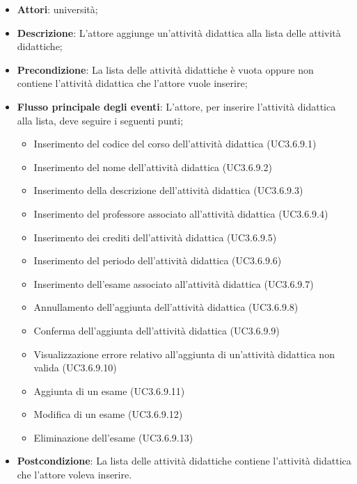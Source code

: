 \begin{itemize}
\item \textbf{Attori}: università;
\item \textbf{Descrizione}: L'attore aggiunge un'attività didattica alla lista delle attività didattiche;

\item \textbf{Precondizione}: La lista delle attività didattiche è vuota oppure non contiene l'attività didattica che l'attore vuole inserire;

\item \textbf{Flusso principale degli eventi}: L'attore, per inserire l'attività didattica alla lista, deve seguire i seguenti punti;

\begin{itemize}
\item Inserimento del codice del corso dell’attività didattica (UC3.6.9.1)
\item Inserimento del nome dell’attività didattica (UC3.6.9.2)
\item Inserimento della descrizione dell’attività didattica (UC3.6.9.3)
\item Inserimento del professore associato all’attività didattica (UC3.6.9.4)
\item Inserimento dei crediti dell’attività didattica (UC3.6.9.5)
\item Inserimento del periodo dell’attività didattica (UC3.6.9.6)
\item Inserimento dell’esame associato all’attività didattica (UC3.6.9.7)
\item Annullamento dell’aggiunta dell’attività didattica (UC3.6.9.8)
\item Conferma dell’aggiunta dell’attività didattica (UC3.6.9.9)
\item Visualizzazione errore relativo all’aggiunta di un’attività didattica non valida (UC3.6.9.10)
\item Aggiunta di un esame (UC3.6.9.11)
\item Modifica di un esame (UC3.6.9.12)
\item Eliminazione dell’esame (UC3.6.9.13)
\end{itemize}
\item \textbf{Postcondizione}: La lista delle attività didattiche contiene l'attività didattica che l'attore voleva inserire.

\end{itemize}
